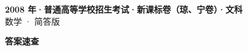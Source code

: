 \documentclass[zihao=-4, a4paper]{ctexart}
\begin{document}
\begin{center}
  {\Large\bfseries 2008 年·普通高等学校招生考试·新课标卷（琼、宁卷）·文科}\\[4pt]
  {\large 数学 · 简答版}
\end{center}
\medskip
{}

\clearpage
{}
\begin{center}{\Large\bfseries 答案速查}\end{center}
\medskip

\end{document}

